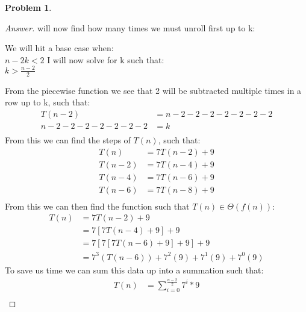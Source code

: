 \documentclass[11pt]{article}
\theoremstyle{definition}
\theoremstyle{definition}
\newtheorem{required}{Problem}
\theoremstyle{definition}
\begin{document}
\begin{required}
\begin{enumerate}
\begin{proof}[Answer] 
 will now find how many times we must unroll first up to k: \\
\begin{center}
We will hit a base case when: \\
$n-2k < 2$
I will now solve for k such that: \\
$k > \frac{n-2}{2}$
\end{center}
From the piecewise function we see that 2 will be subtracted multiple times in a row up to k, such that: \\
\begin{align*}
T(n-2) &= n - 2 - 2 - 2 - 2 - 2 - 2 - 2 \\
n - 2 - 2 - 2 - 2 - 2 - 2 - 2 &= k \\
\end{align*}
From this we can find the steps of $T(n)$, such that: \\
\begin{align*}
T(n) &= 7T(n-2) + 9  \\
T(n-2) &= 7T(n-4) + 9 \\
T(n-4) &= 7T(n-6) + 9 \\
T(n-6) &= 7T(n-8) + 9 \\
\end{align*}
From this we can then find the function such that $T(n) \in \Theta(f(n))$: \\
\begin{align*}
T(n) &= 7T(n-2) + 9  \\
&= 7[7T(n-4) + 9] +9 \\
&= 7[7[7T(n-6) + 9] +9] + 9 \\
&= 7^3(T(n-6)) +7^2(9) + 7^1(9) + 7^0(9)
\end{align*}
To save us time we can sum this data up into a summation such that: \\
\begin{align*}
T(n) &= \sum_{i=0}^{\frac{n-2}{2}} 7^{i} * 9 \\
\end{align*}


\end{proof}
\end{enumerate}
\end{required}
\end{document}
